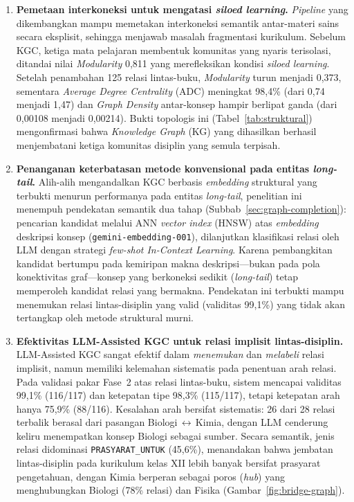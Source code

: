 \documentclass[main]{subfiles}
\begin{document}
\begin{enumerate}
  \item \textbf{Pemetaan interkoneksi untuk mengatasi \textit{siloed learning}.}
        \textit{Pipeline} yang dikembangkan mampu memetakan interkoneksi semantik
        antar-materi sains secara eksplisit, sehingga menjawab masalah
        fragmentasi kurikulum. Sebelum KGC, ketiga mata pelajaran membentuk
        komunitas yang nyaris terisolasi, ditandai nilai \textit{Modularity}
        0{,}811 yang merefleksikan kondisi \textit{siloed learning}. Setelah
        penambahan 125 relasi lintas-buku, \textit{Modularity} turun menjadi
        0{,}373, sementara \textit{Average Degree Centrality} (ADC) meningkat
        98{,}4\% (dari 0{,}74 menjadi 1{,}47) dan \textit{Graph Density}
        antar-konsep hampir berlipat ganda (dari 0{,}00108 menjadi 0{,}00214).
        Bukti topologis ini (Tabel~\ref{tab:struktural}) mengonfirmasi bahwa
        \textit{Knowledge Graph} (KG) yang dihasilkan berhasil menjembatani
        ketiga komunitas disiplin yang semula terpisah.

  \item \textbf{Penanganan keterbatasan metode konvensional pada entitas
        \textit{long-tail}.} Alih-alih mengandalkan KGC berbasis \textit{embedding}
        struktural yang terbukti menurun performanya pada entitas \textit{long-tail},
        penelitian ini menempuh pendekatan semantik dua tahap
        (Subbab~\ref{sec:graph-completion}): pencarian kandidat melalui ANN
        \textit{vector index} (HNSW) atas \textit{embedding} deskripsi konsep
        (\texttt{gemini-embedding-001}), dilanjutkan klasifikasi relasi oleh LLM
        dengan strategi \textit{few-shot In-Context Learning}. Karena pembangkitan
        kandidat bertumpu pada kemiripan makna deskripsi---bukan pada pola
        konektivitas graf---konsep yang berkoneksi sedikit (\textit{long-tail})
        tetap memperoleh kandidat relasi yang bermakna. Pendekatan ini terbukti
        mampu menemukan relasi lintas-disiplin yang valid (validitas 99{,}1\%)
        yang tidak akan tertangkap oleh metode struktural murni.

  \item \textbf{Efektivitas LLM-Assisted KGC untuk relasi implisit
        lintas-disiplin.} LLM-Assisted KGC sangat efektif dalam \textit{menemukan}
        dan \textit{melabeli} relasi implisit, namun memiliki kelemahan sistematis
        pada penentuan arah relasi. Pada validasi pakar Fase~2 atas relasi
        lintas-buku, sistem mencapai validitas 99{,}1\% (116/117) dan ketepatan
        tipe 98{,}3\% (115/117), tetapi ketepatan arah hanya 75{,}9\% (88/116).
        Kesalahan arah bersifat sistematis: 26 dari 28 relasi terbalik berasal
        dari pasangan Biologi\,$\leftrightarrow$\,Kimia, dengan LLM cenderung
        keliru menempatkan konsep Biologi sebagai sumber. Secara semantik, jenis
        relasi didominasi \texttt{PRASYARAT\_UNTUK} (45{,}6\%), menandakan bahwa
        jembatan lintas-disiplin pada kurikulum kelas XII lebih banyak bersifat
        prasyarat pengetahuan, dengan Kimia berperan sebagai poros (\textit{hub})
        yang menghubungkan Biologi (78\% relasi) dan Fisika
        (Gambar~\ref{fig:bridge-graph}).


\end{enumerate}
\end{document}

